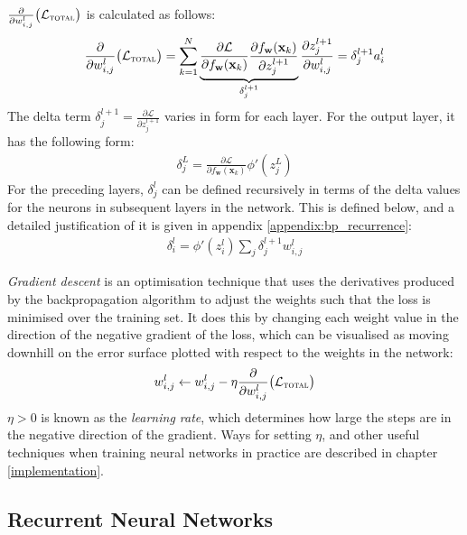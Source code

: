 \documentclass[a4paper, 12pt]{report}
\newcommand{\tit}[1]{\textit{#1}}
\begin{document}
$\frac{\partial}{\partial w_{i,j}^l} \big( \mathcal{L}_{\text{\scshape total}} \big)$ is calculated as follows:
\begin{gather} \label{eq:bp_weight_grad}
	\frac{\partial}{\partial w_{i,j}^l} \big( \mathcal{L}_{\text{\scshape total}} \big) = \sum_{k = 1}^N \underbrace{\frac{\partial \mathcal{L}}{\partial f_{\mathbf{w}}(\mathbf{x}_k)}  \frac{\partial f_{\mathbf{w}}(\mathbf{x}_k)}{\partial z_j^{l + 1}}}_{\delta_j^{l+1}}  \frac{\partial z_j^{l + 1}}{\partial w_{i,j}^l} = \delta_j^{l+1} a_i^l
\end{gather}
The delta term $\delta_j^{l+1}=\frac{\partial \mathcal{L}}{\partial z_j^{l + 1}}$ varies in form for each layer. For the output layer, it has the following form:
\begin{gather} \label{eq:delta_output}
	\delta_j^L = \frac{\partial \mathcal{L}}{\partial f_{\mathbf{w}}(\mathbf{x}_k)} \phi'(z_j^L)
\end{gather}
For the preceding layers, $\delta_j^l$ can be defined recursively in terms of the delta values for the neurons in subsequent layers in the network. This is defined below, and a detailed justification of it is given in appendix \ref{appendix:bp_recurrence}:
\begin{gather} \label{eq:delta_hidden}
	\delta_i^l = \phi'(z_i^l) \sum_j \delta_j^{l+1} w_{i,j}^l
\end{gather}

\tit{Gradient descent} is an optimisation technique that uses the derivatives produced by the backpropagation algorithm to adjust the weights such that the loss is minimised over the training set. It does this by changing each weight value in the direction of the negative gradient of the loss, which can be visualised as moving downhill on the error surface plotted with respect to the weights in the network:
\begin{gather}
	w_{i,j}^l \leftarrow w_{i,j}^l - \eta \frac{\partial}{\partial w_{i,j}^l} \big( \mathcal{L}_{\text{\scshape total}} \big)
\end{gather}
$\eta > 0$ is known as the \tit{learning rate}, which determines how large the steps are in the negative direction of the gradient. Ways for setting $\eta$, and other useful techniques when training neural networks in practice are described in chapter \ref{implementation}.

\subsection{Recurrent Neural Networks} \label{rnns}
\end{document}
